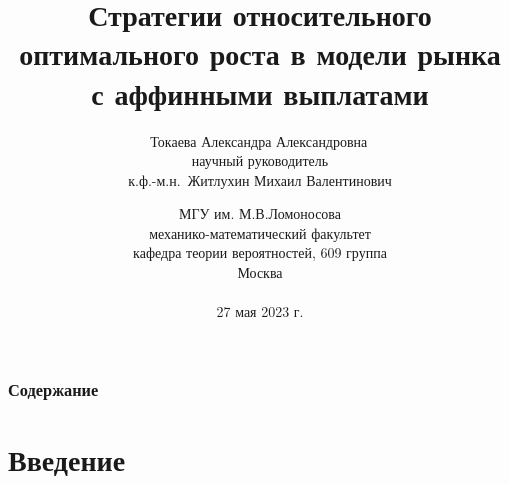 \documentclass[10pt]{beamer}
\theoremstyle{definition}
\theoremstyle{remark}
\begin{document}
\title[Стратегии относительного оптимального роста]{\bf Стратегии относительного оптимального роста в модели рынка с аффинными выплатами\\}
\author[Токаева А.А.]{Токаева Александра Александровна\, \\ научный руководитель\\  к.ф.-м.н.\, Житлухин Михаил Валентинович}
\date{\small{МГУ им. М.В.Ломоносова\\механико-математический факультет\\ кафедра теории вероятностей, 609 группа\\}\vspace{0.5cm} 
Москва\\ \\ 27 мая 2023 г.}


\begin{frame}
  \transdissolve[duration=0.2]
  \titlepage
\end{frame}

\section*{}
\begin{frame}
 \transdissolve[duration=0.2]
 \frametitle{Содержание}
 \tableofcontents
\end{frame}

\section{Введение}
\end{document}
